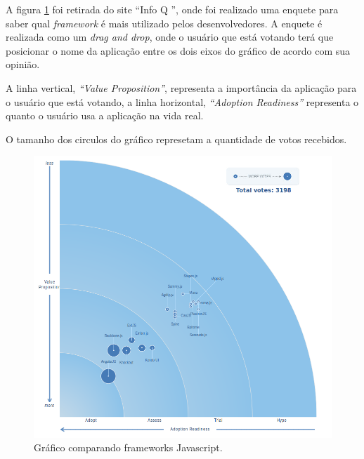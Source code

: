 A figura \ref{fig:Gráfico Comparando Frameworks Javascript} foi retirada do site ``Info Q \cite{fwJs}'', onde foi realizado uma enquete para saber qual \textit{framework} é mais utilizado pelos desenvolvedores. A enquete é realizada como um \textit{drag and drop}, onde o usuário que está votando terá que posicionar o nome da aplicação entre os dois eixos do gráfico de acordo com sua opinião.

A linha vertical, \textit{``Value Proposition''}, representa a importância da aplicação para o usuário que está votando, a linha horizontal, \textit{``Adoption Readiness''} representa o quanto o usuário usa a aplicação na vida real. 

O tamanho dos circulos do gráfico represetam a quantidade de votos recebidos.

\begin{figure}[!ht]
\centering
\includegraphics[scale=0.5]{images/angularjs_framework_comparison.png}
\caption{Gráfico comparando frameworks Javascript. \cite{fwJs}}
\label{fig:Gráfico Comparando Frameworks Javascript}
\end{figure}

\newpage

